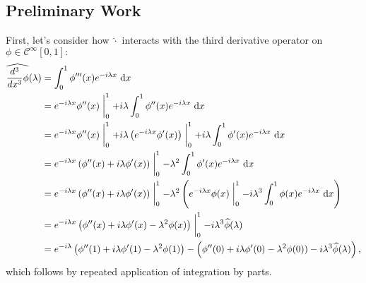 \subsection*{Preliminary Work}
First, let's consider how $\hat{\cdot}$ interacts with the third derivative operator on $\phi \in \mathcal{C}^{\infty}[0,1]:$
\begin{align*}
    \widehat{\frac{d^3}{dx^3}\phi}(\lambda) &= \int^1_0 \phi^{\prime \prime\prime}(x) e^{-i \lambda x} ~ \mathrm{d}x \\
    &= e^{-i \lambda x} \phi^{\prime \prime}(x)  \biggm|^1_0 + i\lambda \int^1_0 \phi^{\prime \prime}(x) e^{-i \lambda x} ~ \mathrm{d}x \\
    &= e^{-i \lambda x} \phi^{\prime \prime}(x)  \biggm|^1_0 + i \lambda  \left(e^{-i \lambda x} \phi^{\prime}(x) \right)  \biggm|^1_0 + i \lambda \int^1_0 \phi^{\prime}(x) e^{-i \lambda x} ~ \mathrm{d}x \\
    &= e^{-i \lambda x}  \left(\phi^{\prime \prime}(x) + i \lambda \phi^{\prime}(x) \right)  \biggm|^1_0 - \lambda^2 \int^1_0 \phi^{\prime}(x) e^{-i \lambda x} ~ \mathrm{d}x \\ 
    &= e^{-i \lambda x}  \left(\phi^{\prime \prime}(x) + i \lambda \phi^{\prime}(x) \right) \biggm|^1_0 - \lambda^2 \left(e^{-i \lambda x} \phi(x)  \biggm|^1_0 - i\lambda^3 \int^1_0 \phi(x) e^{-i \lambda x} ~ \mathrm{d}x\right) \\
    &= e^{-i \lambda x} \left(\phi^{\prime \prime}(x) + i \lambda \phi^{\prime}(x) - \lambda^2\phi(x)\right) \biggm|^1_0 - i \lambda^3 \widehat{\phi}(\lambda) \\
    &= e^{-i \lambda} \left(\phi^{\prime \prime}(1) + i \lambda \phi^{\prime}(1) - \lambda^2\phi(1)\right) - \left(\phi^{\prime \prime}(0) + i \lambda \phi^{\prime}(0) - \lambda^2\phi(0)) - i \lambda^3 \widehat{\phi}(\lambda)\right),
\end{align*}
which follows by repeated application of integration by parts. 
